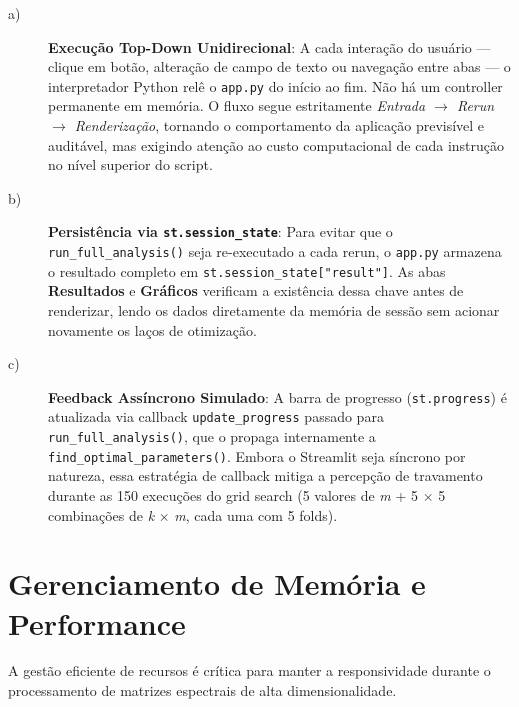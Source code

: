 \begin{description}

\item[a)] \textbf{Execução Top-Down Unidirecional}: A cada interação do usuário — clique
em botão, alteração de campo de texto ou navegação entre abas — o interpretador Python
relê o \texttt{app.py} do início ao fim. Não há um controller permanente em memória.
O fluxo segue estritamente \textit{Entrada $\rightarrow$ Rerun $\rightarrow$ Renderização},
tornando o comportamento da aplicação previsível e auditável, mas exigindo atenção ao
custo computacional de cada instrução no nível superior do script.

\item[b)] \textbf{Persistência via \texttt{st.session\_state}}: Para evitar que o
\texttt{run\_full\_analysis()} seja re-executado a cada rerun, o \texttt{app.py}
armazena o resultado completo em \texttt{st.session\_state["result"]}. As abas
\textbf{Resultados} e \textbf{Gráficos} verificam a existência dessa chave antes de
renderizar, lendo os dados diretamente da memória de sessão sem acionar novamente os
laços de otimização.

\item[c)] \textbf{Feedback Assíncrono Simulado}: A barra de progresso
(\texttt{st.progress}) é atualizada via callback \texttt{update\_progress} passado para
\texttt{run\_full\_analysis()}, que o propaga internamente a
\texttt{find\_optimal\_parameters()}. Embora o Streamlit seja síncrono por natureza, essa
estratégia de callback mitiga a percepção de travamento durante as 150 execuções do grid
search (5 valores de \textit{m} + 5 $\times$ 5 combinações de \textit{k} $\times$
\textit{m}, cada uma com 5 folds).

\end{description}

\section{Gerenciamento de Memória e Performance}

A gestão eficiente de recursos é crítica para manter a responsividade durante o
processamento de matrizes espectrais de alta dimensionalidade.

